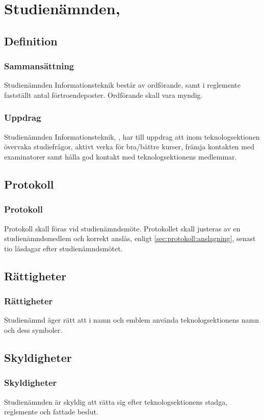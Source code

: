\section{Studienämnden, \SNIT}

\subsection{Definition}

\subsubsection{Sammansättning}
Studienämnden Informationsteknik består av ordförande, samt i reglemente fastställt antal förtroendeposter. Ordförande skall vara myndig.

\subsubsection{Uppdrag}
Studienämnden Informationsteknik, \SNIT{}, har till uppdrag att inom teknologsektionen övervaka studiefrågor, aktivt verka för bra/bättre kurser, främja kontakten med examinatorer samt hålla god kontakt med teknologsektionens medlemmar.

\subsection{Protokoll}

\subsubsection{Protokoll}
Protokoll skall föras vid studienämndsmöte. Protokollet skall justeras av en studienämndsmedlem och korrekt anslås, enligt \ref{sec:protokoll:anslagning}, senast tio läsdagar efter studienämndsmötet.

\subsection{Rättigheter}

\subsubsection{Rättigheter}
Studienämnd äger rätt att i namn och emblem använda teknologsektionens namn och dess symboler.

\subsection{Skyldigheter}

\subsubsection{Skyldigheter}
Studienämnden är skyldig att rätta sig efter teknologsektionens stadga, reglemente och fattade beslut.